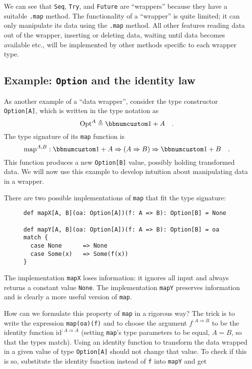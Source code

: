 We can see that \lstinline!Seq!, \lstinline!Try!, and \lstinline!Future!
are ``wrappers'' because they have a suitable \lstinline!.map!
method. The functionality of a ``wrapper'' is quite limited; it
can only manipulate its data using the \lstinline!.map! method. All
other features \textendash{} reading data out of the wrapper, inserting
or deleting data, waiting until data becomes available etc., \textendash{}
will be implemented by other methods specific to each wrapper type.

\subsection{Example: \texttt{Option} and the identity law\label{subsec:f-Example:-Option-and}}

As another example of a ``data wrapper'', consider the type constructor
\lstinline!Option[A]!, which is written in the type notation as 
\[
\text{Opt}^{A}\triangleq\bbnum 1+A\quad.
\]
The type signature of its \lstinline!map! function is
\[
\text{map}^{A,B}:\bbnum 1+A\Rightarrow\left(A\Rightarrow B\right)\Rightarrow\bbnum 1+B\quad.
\]
This function produces a new \lstinline!Option[B]! value, possibly
holding transformed data. We will now use this example to develop
intuition about manipulating data in a wrapper.

There are two possible implementations of \lstinline!map! that fit
the type signature:

\begin{wrapfigure}{l}{0.65\columnwidth}%
\vspace{-0.3\baselineskip}
\begin{lstlisting}
def mapX[A, B](oa: Option[A])(f: A => B): Option[B] = None

def mapY[A, B](oa: Option[A])(f: A => B): Option[B] = oa match {
  case None      => None
  case Some(x)   => Some(f(x))
}
\end{lstlisting}
\vspace{-1\baselineskip}
\end{wrapfigure}%
The implementation \lstinline!mapX! loses information:
it ignores all input and always returns a constant value \lstinline!None!.
The implementation \lstinline!mapY! preserves information and is
clearly a more useful version of \lstinline!map!. 

How can we formulate this property of \lstinline!map! in a rigorous
way? The trick is to write the expression \lstinline!map(oa)(f)!
and to choose the argument $f^{:A\Rightarrow B}$ to be the identity
function $\text{id}^{:A\Rightarrow A}$ (setting \lstinline!map!'s
type parameters to be equal, $A=B$, so that the types match). Using
an identity function to transform the data wrapped in a given value
of type \lstinline!Option[A]! should not change that value. To check
if this is so, substitute the identity function instead of \lstinline!f!
into \lstinline!mapY! and get

